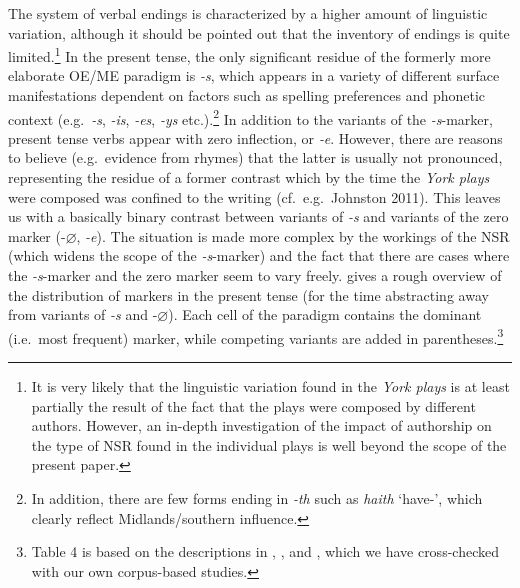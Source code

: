 \documentclass[output=paper]{langsci/langscibook}
\begin{document}
The system of verbal  endings is characterized by a higher
amount of linguistic variation, although it should be pointed out that the
inventory of endings is quite limited.\footnote{It is very likely that the
linguistic variation found in the \emph{York plays} is at least partially the
result of the fact that the plays were composed by different authors. However,
an in-depth investigation of the impact of authorship on the type of
\gls{NSR} found in the individual plays is well
beyond the scope of the present paper.} In the present tense, the only
significant residue of the formerly more elaborate \gls{OE}/ME 
paradigm is \emph{-s}, which appears in a variety of different surface
manifestations dependent on factors such as spelling preferences and phonetic
context (e.g.~\emph{-s}, \emph{-is}, \emph{-es}, \emph{-ys} etc.).\footnote{In
addition, there are few \Tsg{} forms ending in \emph{-th} such as \emph{haith}
`have-\Tsg{}', which clearly reflect Midlands/southern influence.} In addition
to the variants of the \emph{-s}-marker, present tense verbs appear with zero
inflection, or \emph{‑e}. However, there are reasons to believe (e.g.\ evidence
from rhymes) that the latter is usually not pronounced, representing the
residue of a former contrast which by the time the \emph{York plays} were
composed was confined to the writing (cf.\ e.g.\ Johnston 2011). This leaves us
with a basically binary contrast between variants of \emph{-s} and variants of
the zero marker (-$\varnothing$, \emph{-e}). The situation is made more complex
by the workings of the \gls{NSR} (which widens the
scope of the \emph{-s}-marker) and the fact that there are cases where the
\emph{-s}-marker and the zero marker seem to vary freely. 
gives a rough overview of the distribution of markers in the present tense (for
the time abstracting away from variants of \emph{-s} and -$\varnothing$). Each
cell of the paradigm contains the dominant (i.e.\ most frequent) marker, while
competing variants are added in parentheses.\footnote{Table 4 is based on the
descriptions in \cite[lxxii]{Smith:1885}, \cite[272]{BurrowTurville-Petre:2005},
and \cite{Johnston:2011}, which we have cross-checked with our own corpus-based
studies.}\pagebreak
\end{document}
